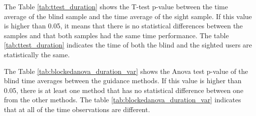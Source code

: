 %

The Table \ref{tab:ttest_duration} shows the T-test p-value between the time average of the blind sample and the time average of the sight sample. If this value is higher than 0.05, it means that there is no statistical differences between the samples and that both samples had the same time performance. The table \ref{tab:ttest_duration} indicates the time of both the blind and the sighted users are statistically the same.

%

\begin{table}[!htb]
    \begin{minipage}{.45\linewidth}
        
    \end{minipage}
    \hfill
    \begin{minipage}{.45\linewidth}
        \vspace{-1.5cm}
        
    \end{minipage}
\end{table}

The Table \ref{tab:blockedanova_duration_var} shows the Anova test p-value of the blind time averages between the guidance methods. If this value is higher than 0.05, there is at least one method that has no statistical difference between one from the other methods. The table \ref{tab:blockedanova_duration_var} indicates that at all of the time observations are different.

%

%

%



%
%

